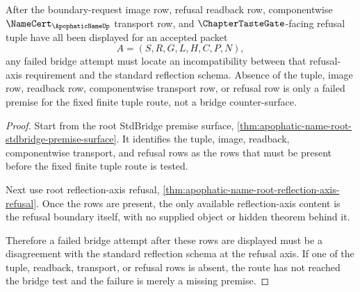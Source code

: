 \begin{theorem}
\label{thm:apophatic-name-root-bridge-counter-surface}
After the boundary-request image row, refusal readback row, componentwise $\NameCert_{\ApophaticNameUp}$ transport row, and $\ChapterTasteGate$-facing refusal tuple have all been displayed for an accepted packet
$$
A=(S,R,G,L,H,C,P,N),
$$
any failed bridge attempt must locate an incompatibility between that refusal-axis requirement and the standard reflection schema. Absence of the tuple, image row, readback row, componentwise transport row, or refusal row is only a failed premise for the fixed finite tuple route, not a bridge counter-surface.
\end{theorem}
\begin{proof}
Start from the root StdBridge premise surface, \autoref{thm:apophatic-name-root-stdbridge-premise-surface}. It identifies the tuple, image, readback, componentwise transport, and refusal rows as the rows that must be present before the fixed finite tuple route is tested.

Next use root reflection-axis refusal, \autoref{thm:apophatic-name-root-reflection-axis-refusal}. Once the rows are present, the only available reflection-axis content is the refusal boundary itself, with no supplied object or hidden theorem behind it.

Therefore a failed bridge attempt after these rows are displayed must be a disagreement with the standard reflection schema at the refusal axis. If one of the tuple, readback, transport, or refusal rows is absent, the route has not reached the bridge test and the failure is merely a missing premise.
\end{proof}

